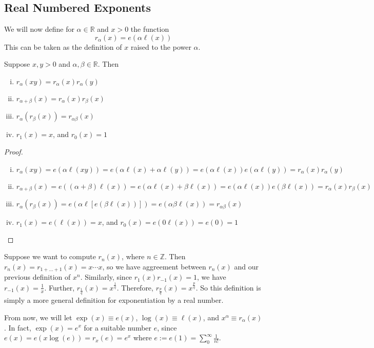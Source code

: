 \documentclass{article}
\begin{document}
\subsection{Real Numbered Exponents}
We will now define for $\alpha \in \mathbb R$ and $x > 0$ the function
\[ r_\alpha(x) = e(\alpha \ell(x)) \]
This can be taken as the definition of $x$ raised to the power $\alpha$.
\begin{theorem}
    Suppose $x, y > 0$ and $\alpha, \beta \in \mathbb R$. Then
    \begin{enumerate}[(i)]
        \item $r_\alpha(xy) = r_\alpha(x)r_\alpha(y)$
        \item $r_{\alpha + \beta}(x) = r_\alpha(x) r_\beta(x)$
        \item $r_\alpha(r_\beta(x)) = r_{\alpha\beta}(x)$
        \item $r_1(x) = x$, and $r_0(x) = 1$
    \end{enumerate}
\end{theorem}
\begin{proof}
    \begin{enumerate}[(i)]
        \item $r_\alpha(xy) = e(\alpha \ell(xy)) = e(\alpha \ell(x) + \alpha \ell(y)) = e(\alpha \ell(x))e(\alpha\ell(y)) = r_\alpha(x)r_\alpha(y)$
        \item $r_{\alpha + \beta}(x) = e((\alpha + \beta) \ell(x)) = e(\alpha\ell(x) + \beta\ell(x)) = e(\alpha\ell(x))e(\beta\ell(x)) = r_\alpha(x) r_\beta(x)$
        \item $r_\alpha(r_\beta(x)) = e(\alpha \ell[e(\beta \ell(x))]) = e(\alpha \beta \ell(x)) = r_{\alpha\beta}(x)$
        \item $r_1(x) = e(\ell(x)) = x$, and $r_0(x) = e(0 \ell(x)) = e(0) = 1$
    \end{enumerate}
\end{proof}
\noindent Suppose we want to compute $r_n(x)$, where $n \in\mathbb Z$. Then $r_n(x) = r_{1 + \dots + 1}(x) = x \cdots x$, so we have aggreement between $r_n(x)$ and our previous definition of $x^n$. Similarly, since $r_1(x) r_{-1}(x) = 1$, we have $r_{-1}(x) = \frac{1}{x}$. Further, $r_{\frac{1}{q}}(x) = x^\frac{1}{q}$. Therefore, $r_{\frac{p}{q}}(x) = x^{\frac{p}{q}}$. So this definition is simply a more general definition for exponentiation by a real number.

From now, we will let $\exp(x) \equiv e(x)$, $\log(x) \equiv \ell(x)$, and $x^\alpha \equiv r_\alpha(x)$. In fact, $\exp(x) = e^x$ for a suitable number $e$, since $e(x) = e(x \log(e)) = r_x(e) = e^x$ where $e := e(1) = \sum_0^\infty \frac{1}{n!}$.
\end{document}

